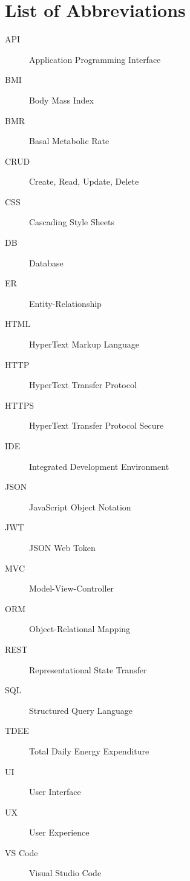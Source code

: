 \chapter*{List of Abbreviations}

\begin{description}
    \item[API] Application Programming Interface
    \item[BMI] Body Mass Index
    \item[BMR] Basal Metabolic Rate
    \item[CRUD] Create, Read, Update, Delete
    \item[CSS] Cascading Style Sheets
    \item[DB] Database
    \item[ER] Entity-Relationship
    \item[HTML] HyperText Markup Language
    \item[HTTP] HyperText Transfer Protocol
    \item[HTTPS] HyperText Transfer Protocol Secure
    \item[IDE] Integrated Development Environment
    \item[JSON] JavaScript Object Notation
    \item[JWT] JSON Web Token
    \item[MVC] Model-View-Controller
    \item[ORM] Object-Relational Mapping
    \item[REST] Representational State Transfer
    \item[SQL] Structured Query Language
    \item[TDEE] Total Daily Energy Expenditure
    \item[UI] User Interface
    \item[UX] User Experience
    \item[VS Code] Visual Studio Code
\end{description}
